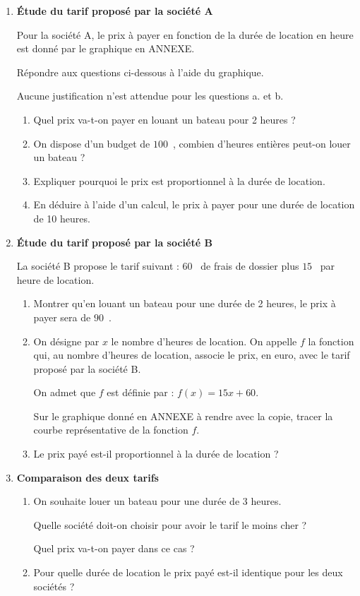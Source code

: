 \documentclass[11pt]{article}
\newcommand{\euro}{\eurologo{}}
\begin{document}
\begin{enumerate}
\item \textbf{Étude du tarif proposé par la société A}

\medskip

Pour la société A, le prix à payer en fonction de la durée de location en heure est donné par le graphique en ANNEXE.

Répondre aux questions ci-dessous à l'aide du graphique.

Aucune justification n'est attendue pour les questions a. et b.
	\begin{enumerate}
		\item Quel prix va-t-on payer en louant un bateau pour 2 heures ?
		\item On dispose d'un budget de $100$~\euro, combien d'heures entières peut-on louer un bateau ?
		\item Expliquer pourquoi le prix est proportionnel à la durée de location.
		\item En déduire à l'aide d'un calcul, le prix à payer pour une durée de location de 10 heures.
	\end{enumerate}
\item \textbf{Étude du tarif proposé par la société B}

\medskip

La société B propose le tarif suivant : $60$~\euro{} de frais de dossier plus $15$~\euro{} par heure de location.
	\begin{enumerate}
		\item Montrer qu'en louant un bateau pour une durée de 2 heures, le prix à payer sera de $90$~\euro.
		\item On désigne par $x$ le nombre d'heures de location. On appelle $f$ la fonction qui, au nombre d'heures de location, associe le prix, en euro, avec le tarif proposé par la société B.

On admet que $f$ est définie par : $f(x) = 15x + 60$.

Sur le graphique donné en ANNEXE à rendre avec la copie, tracer la courbe représentative de la fonction $f$.
		\item Le prix payé est-il proportionnel à la durée de location ?
	\end{enumerate}
\item \textbf{Comparaison des deux tarifs}
	\begin{enumerate}
		\item On souhaite louer un bateau pour une durée de 3 heures.

Quelle société doit-on choisir pour avoir le tarif le moins cher ?

Quel prix va-t-on payer dans ce cas ?
		\item Pour quelle durée de location le prix payé est-il identique pour les deux sociétés ?
	\end{enumerate}
\end{enumerate}
\end{document}
